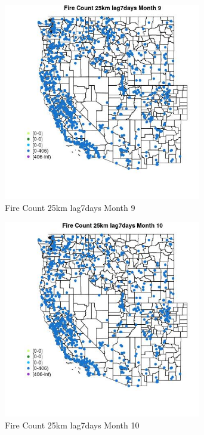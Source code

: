 \begin{figure} 
\centering  
\includegraphics[width=0.77\textwidth]{Code_Outputs/Report_ML_input_PM25_Step4_part_f_de_duplicated_aveswNAs_MapObsMo9Fire_Count_25km_lag7days.jpg} 
\caption{\label{fig:Report_ML_input_PM25_Step4_part_f_de_duplicated_aveswNAsMapObsMo9Fire_Count_25km_lag7days}Fire Count 25km lag7days Month 9} 
\end{figure} 
 

\begin{figure} 
\centering  
\includegraphics[width=0.77\textwidth]{Code_Outputs/Report_ML_input_PM25_Step4_part_f_de_duplicated_aveswNAs_MapObsMo10Fire_Count_25km_lag7days.jpg} 
\caption{\label{fig:Report_ML_input_PM25_Step4_part_f_de_duplicated_aveswNAsMapObsMo10Fire_Count_25km_lag7days}Fire Count 25km lag7days Month 10} 
\end{figure} 
 

